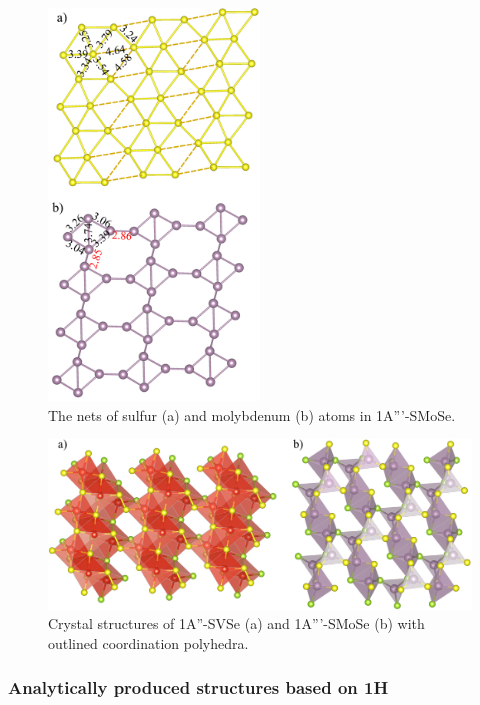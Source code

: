 \documentclass[a4paperm]{article}
\begin{document}
\begin{figure}[H]
	\includegraphics[width=0.5\textwidth]{airss3_smose.png}
	\caption{The nets of sulfur (a) and molybdenum (b) atoms in 1A'''-SMoSe.}
	\label{airss3_smose}
\end{figure}


\begin{figure}[H]
	\includegraphics[width=\textwidth]{airss3_poly.png}
	\caption{Crystal structures of 1A''-SVSe (a) and 1A'''-SMoSe (b) with outlined coordination polyhedra.}
	\label{airss3_poly}
\end{figure}




\subsubsection{Analytically produced structures based on 1H}
\end{document}

